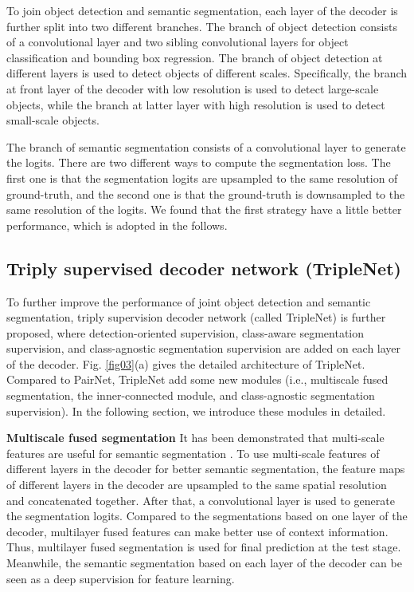 \documentclass[10pt,twocolumn,letterpaper]{article}
\begin{document}
To join object detection and semantic segmentation, each layer of the decoder is further split into two different branches. The branch of object detection consists of a  convolutional layer and two sibling  convolutional layers for object classification and bounding box regression. The branch of object detection at different layers is used to detect objects of different scales. Specifically, the branch at front layer of the decoder with low resolution is used to detect large-scale objects, while the branch at latter layer with high resolution is used to detect small-scale objects. 

The branch of semantic segmentation consists of a  convolutional layer to generate the logits. There are two different ways to compute the segmentation loss. The first one is that the segmentation logits are upsampled to the same resolution of ground-truth, and the second one is that the ground-truth is downsampled to the same resolution of the logits. We found that the first strategy have a little better performance, which is adopted in the follows. 

\subsection{Triply supervised decoder network (TripleNet)}
To further improve the performance of joint object detection and semantic segmentation, triply supervision decoder network (called TripleNet) is further proposed, where detection-oriented supervision, class-aware segmentation supervision, and class-agnostic segmentation supervision are added on each layer of the decoder. Fig. \ref{fig03}(a) gives the detailed architecture of TripleNet.  Compared to PairNet, TripleNet add some new modules (i.e., multiscale fused segmentation, the inner-connected module, and class-agnostic segmentation supervision).  In the following section, we introduce these modules in detailed.

\textbf{Multiscale fused segmentation} It has been demonstrated that multi-scale features are useful for semantic segmentation \cite{Dvornik_Blitznet_ICCV_2017,Zhao_PSPNet_CVPR_2017,Yu_Dilate_ICLR_2016}. To use multi-scale features of different layers in the decoder for better semantic segmentation, the feature maps of different layers in the decoder are upsampled to the same spatial resolution and concatenated together. After that, a  convolutional layer is used to generate the segmentation logits. Compared to the segmentations based on one layer of the decoder, multilayer fused features can make better use of context information. Thus, multilayer fused segmentation is used for final prediction at the test stage. Meanwhile, the semantic segmentation based on each layer of the decoder can be seen as a deep supervision for feature learning.
\end{document}
